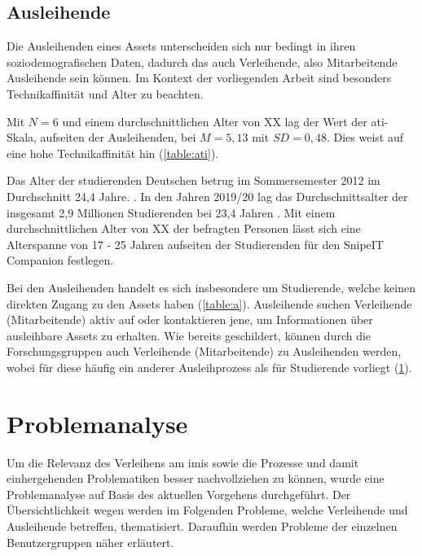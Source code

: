 \subsection{Ausleihende}
Die Ausleihenden eines Assets unterscheiden sich nur bedingt in ihren
soziodemografischen Daten, dadurch das auch Verleihende, also Mitarbeitende
Ausleihende sein können. Im Kontext der vorliegenden Arbeit sind besonders
Technikaffinität und Alter zu beachten.

Mit $N=6$ und einem durchschnittlichen Alter von XX lag der Wert der
\ac{ati}-Skala, aufseiten der Ausleihenden, bei $M=5,13$ mit $SD=0,48$. Dies
weist auf eine hohe Technikaffinität hin (\ref{table:ati}).

Das Alter der studierenden Deutschen betrug im Sommersemester 2012 im
Durchschnitt 24,4 Jahre. \cite{middendorff2017wirtschaftliche}. In den Jahren
2019/20 lag das Durchschnittsalter der insgesamt 2,9 Millionen Studierenden bei
23,4 Jahren \cite{noauthor_studierende_nodate}. Mit einem durchschnittlichen
Alter von XX der befragten Personen lässt sich eine Alterspanne von 17 - 25
Jahren aufseiten der Studierenden für den SnipeIT Companion festlegen.

Bei den Ausleihenden handelt es sich insbesondere um Studierende, welche keinen
direkten Zugang zu den Assets haben (\ref{table:a}). Ausleihende suchen
Verleihende (Mitarbeitende) aktiv auf oder kontaktieren jene, um Informationen
über ausleihbare Assets zu erhalten. Wie bereits geschildert, können durch die
Forschungsgruppen auch Verleihende (Mitarbeitende) zu Ausleihenden werden,
wobei für diese häufig ein anderer Ausleihprozess als für Studierende
vorliegt (\ref{section:iststand}).


\section{Problemanalyse}
\label{section:iststand}

Um die Relevanz des Verleihens am \ac{imis} sowie die Prozesse und damit
einhergehenden Problematiken besser nachvollziehen zu können, wurde eine
Problemanalyse auf Basis des aktuellen Vorgehens durchgeführt. Der
Übersichtlichkeit wegen werden im Folgenden Probleme, welche Verleihende und
Ausleihende betreffen, thematisiert. Daraufhin werden Probleme der einzelnen
Benutzergruppen näher erläutert.

